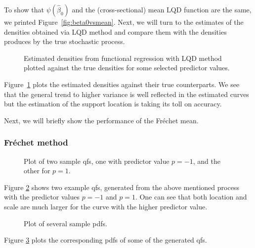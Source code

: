 To show that $\psi(\hat{\beta}_0)$ and the (cross-sectional) mean LQD function are the
same, we printed Figure~\ref{fig:beta0vsmean}. Next, we will turn to the estimates of
the densities obtained via LQD method and compare them with the densities produces by
the true stochastic process.
\begin{figure}[h!]
    \centering
    \resizebox{1\textwidth}{!}{}
    \caption[Comparison: estimated vs. true densities --- LQD]{Estimated densities from
    functional regression with LQD method plotted against the true densities for some
    selected predictor values.}
    \label{fig:func_est_vs_true}
\end{figure}
Figure~\ref{fig:func_est_vs_true} plots the estimated densities against their true
counterparts. We see that the general trend to higher variance is well reflected in the
estimated curves but the estimation of the support location is taking its toll on
accuracy.

Next, we will briefly show the performance of the Fréchet mean.
\subsubsection{Fréchet method}
\label{sec:app_frechet}

\begin{figure}[h!]
    \centering
    \resizebox{1\textwidth}{!}{}
    \caption[Two sample qfs]{Plot of two sample qfs, one with predictor value $p = -1$,
    and the other for $p = 1$.}
    \label{fig:1stlastqf}
\end{figure}

Figure \ref{fig:1stlastqf} shows two example qfs, generated from the above mentioned
process with the predictor values $p=-1$ and $p=1$. One can see that both location and
scale are much larger for the curve with the higher predictor value.

\begin{figure}[h!]
    \centering
    \resizebox{1\textwidth}{!}{}
    \caption[Several sampled pdfs]{Plot of several sample pdfs.}
    \label{fig:some_densities}
\end{figure}

Figure \ref{fig:some_densities} plots the corresponding pdfs of some of the generated qfs.

